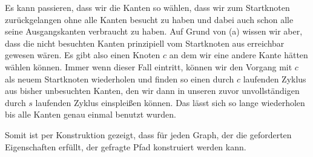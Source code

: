 \documentclass[parskip=half,a4paper]{scrartcl}
\begin{document}
Es kann passieren, dass wir die Kanten so wählen, dass wir zum Startknoten zurückgelangen ohne alle Kanten besucht zu haben und dabei auch schon alle seine Ausgangskanten verbraucht zu haben. Auf Grund von (a) wissen wir aber, dass die nicht besuchten Kanten prinzipiell vom Startknoten aus erreichbar gewesen wären. Es gibt also einen Knoten $c$ an dem wir eine andere Kante hätten wählen können. Immer wenn dieser Fall eintritt, können wir den Vorgang mit $c$ als neuem Startknoten wiederholen und finden so einen durch $c$ laufenden Zyklus aus bisher unbesuchten Kanten, den wir dann in unseren zuvor unvollständigen durch $s$ laufenden Zyklus einsplei\ss en können. Das lässt sich so lange wiederholen bis alle Kanten genau einmal benutzt wurden.

Somit ist per Konstruktion gezeigt, dass für jeden Graph, der die geforderten Eigenschaften erfüllt, der gefragte Pfad konstruiert werden kann.
\end{document}
